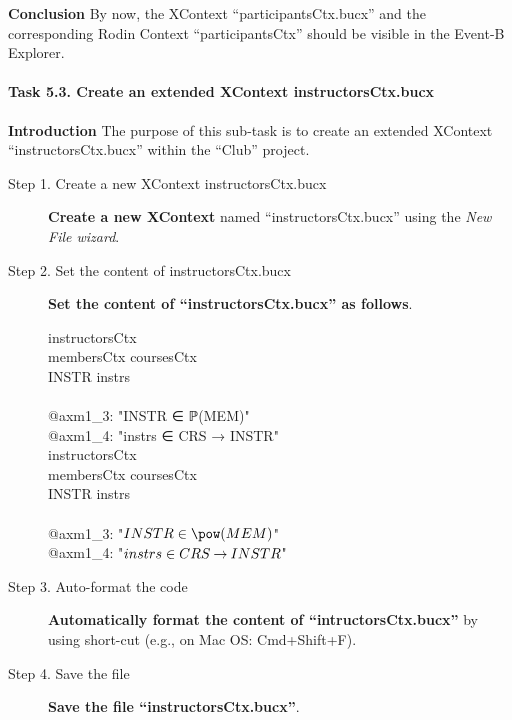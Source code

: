 \textbf{Conclusion} By now, the XContext ``participantsCtx.bucx'' and the corresponding Rodin Context ``participantsCtx'' should be visible in the Event-B Explorer.

\paragraph{Task 5.3. Create an extended XContext instructorsCtx.bucx}
\textbf{Introduction} The purpose of this sub-task is to create an extended XContext ``instructorsCtx.bucx'' within the ``Club'' project.
\begin{description}
\item[Step 1. Create a new XContext instructorsCtx.bucx] \textbf{Create a new XContext} named ``instructorsCtx.bucx'' using the \emph{New File wizard}.

\item[Step 2. Set the content of instructorsCtx.bucx] \textbf{Set the content of ``instructorsCtx.bucx'' as follows}.
  \begin{center}
    \begin{Bcode}
      \ifplastex
      \Bcontext{} instructorsCtx\\
      \Bextends{} membersCtx coursesCtx\\
      \Bconstants{} INSTR instrs\\
      \Baxioms\\
      @axm1_3: "INSTR ∈ ℙ(MEM)"\\
      @axm1_4: "instrs ∈ CRS → INSTR"\\
      \Bend
      \else
      \Bcontext{} instructorsCtx\\
      \Bextends{} membersCtx coursesCtx\\
      \Bconstants{} INSTR instrs\\
      \Baxioms\\
      \Btab @axm1_3: "\(INSTR \in \pow(MEM)\)"\\
      \Btab @axm1_4: "\(instrs \in CRS \mathbin\rightarrow INSTR\)"\\
      \Bend
      \fi
    \end{Bcode}
  \end{center}

\item[Step 3. Auto-format the code] \textbf{Automatically format the content of ``intructorsCtx.bucx''} by using short-cut (e.g., on Mac OS: Cmd+Shift+F).

\item[Step 4. Save the file] \textbf{Save the file ``instructorsCtx.bucx''}.
\end{description}

